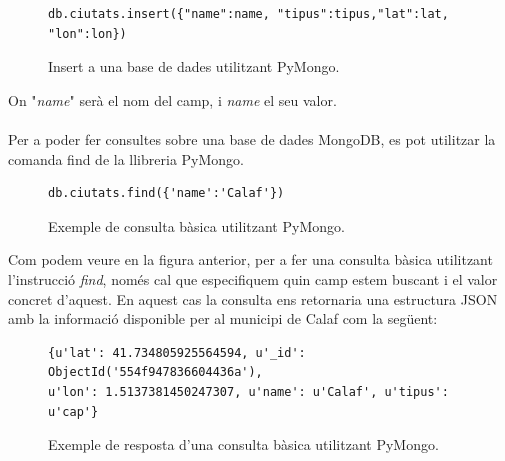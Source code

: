 \documentclass[12pt,a4paper,openright,oneside]{article}
\numberwithin{equation}{section}
\theoremstyle{definition}
\begin{document}
\begin{figure}[!htbp]
\begin{verbatim}
db.ciutats.insert({"name":name, "tipus":tipus,"lat":lat, "lon":lon})
\end{verbatim}
\caption{Insert a una base de dades utilitzant PyMongo.}
\end{figure}
On "\emph{name}" serà el nom del camp, i \emph{name} el seu valor.\\ \\
Per a poder fer consultes sobre una base de dades MongoDB, es pot utilitzar la comanda find de la llibreria PyMongo.

\begin{figure}[htbp]
\begin{verbatim}
db.ciutats.find({'name':'Calaf'})
\end{verbatim}
\caption{Exemple de consulta bàsica utilitzant PyMongo.}
\end{figure}
Com podem veure en la figura anterior, per a fer una consulta bàsica utilitzant l'instrucció \emph{find}, només cal que especifiquem quin camp estem buscant i el valor concret d'aquest. En aquest cas la consulta ens retornaria una estructura JSON amb la informació disponible per al municipi de Calaf com la següent:
\begin{figure}[!htbp]
\begin{verbatim}
{u'lat': 41.734805925564594, u'_id': ObjectId('554f947836604436a'), 
u'lon': 1.5137381450247307, u'name': u'Calaf', u'tipus': u'cap'}
\end{verbatim}
\caption{Exemple de resposta d'una consulta bàsica utilitzant PyMongo.}
\end{figure}
\newpage
\end{document}
